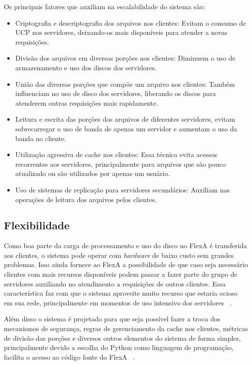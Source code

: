         Os principais fatores que auxiliam na escalabilidade do sistema são:
        
        \begin{itemize}
            \item Criptografia e descriptografia dos arquivos nos clientes: Evitam o consumo de UCP nos servidores, deixando-os mais disponíveis para atender a novas requisições.
            \item Divisão dos arquivos em diversas porções nos clientes: Diminuem o uso de armazenamento e uso dos discos dos servidores.
            \item União das diversas porções que compõe um arquivo nos clientes: Também influenciam no uso de disco dos servidores, liberando os discos para atenderem outras requisições mais rapidamente.
            \item Leitura e escrita das porções dos arquivos de diferentes servidores, evitam sobrecarregar o uso de banda de apenas um servidor e aumentam o uso da banda no cliente.
            \item Utilização agressiva de cache nos clientes: Essa técnica evita acessos recorrentes aos servidores, principalmente para arquivos que são pouco atualizado ou são utilizados por apenas um usuário.
            \item Uso de sistemas de replicação para servidores secundários: Auxiliam nas operações de leitura dos arquivos pelos clientes.
        \end{itemize}
        
        
    \subsection{Flexibilidade}
    
        Como boa parte da carga de processamento e uso do disco no FlexA é transferida aos clientes, o sistema pode operar com \textit{hardware} de baixo custo sem grandes problemas. Isso ainda fornece ao FlexA a possibilidade de que caso seja necessário clientes com mais recursos disponíveis podem passar a fazer parte do grupo de servidores auxiliando no atendimento a requisições de outros clientes. Essa característica faz com que o sistema aproveite muito recurso que estaria ocioso em sua rede, principalmente em momentos de uso intensivo dos servidores ~\cite{silas}.
        
        Além disso o sistema é projetado para que seja possível fazer a troca dos mecanismos de segurança, regras de gerenciamento da cache nos clientes,  métricas de divisão das porções e diversos outros elementos do sistema de forma simples, principalmente devido a escolha do Python como linguagem de programação, facilita o acesso ao código fonte do FlexA ~\cite{silas}.
        
